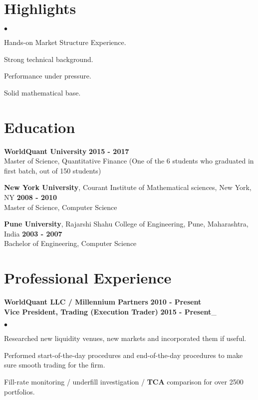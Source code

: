 \documentclass[margin,line]{res}
\newenvironment{list2}{
  \begin{list}{$\bullet$}{%
      \setlength{\itemsep}{0.05in}
      \setlength{\parsep}{0in} \setlength{\parskip}{0in}
      \setlength{\topsep}{-0.1in} \setlength{\partopsep}{0in}
      \setlength{\leftmargin}{0.2in}}}{\end{list}}
\begin{document}
\address{ 1300, Hope St, Stamford, CT 06907 $\bullet$ 917-558-4825 }
\address{ \href{mailto: harsshal@nyu.edu} {harsshal@nyu.edu} $\bullet$
          \href{https://sites.google.com/site/harsshal/}{https://sites.google.com/site/harsshal/} }

\vspace {0.1in}
\begin{resume}
\section{\sc Highlights}
\begin{list2}
\begin{minipage}{0.5\linewidth}
\item Hands-on Market Structure Experience.
\item Strong technical background.
\end{minipage}
\begin{minipage}{0.4\linewidth}
\item Performance under pressure.
\item Solid mathematical base.
\end{minipage}
\end{list2}

\section{\sc Education}
{\bf WorldQuant University} \hfill {\bf  2015 - 2017}\\
Master of Science, Quantitative Finance (One of the 6 students who graduated in first batch, out of 150 students)


{\bf New York University}, Courant Institute of Mathematical sciences, New York, NY \hfill {\bf 2008 - 2010}\\
Master of Science, Computer Science

{\bf Pune University}, Rajarshi Shahu College of Engineering, Pune, Maharashtra, India \hfill{\bf 2003 - 2007}\\
Bachelor of Engineering, Computer Science

\section{\sc Professional Experience}
{\bf WorldQuant LLC / Millennium Partners} \hfill {\bf 2010 - Present}\\
{\bf Vice President, Trading (Execution Trader)} \hfill {\bf 2015 - Present}\_
\begin{list2}
\item Researched new liquidity venues, new markets and incorporated them if useful.
\item Performed start-of-the-day procedures and end-of-the-day procedures to make sure smooth trading for the firm.
\item Fill-rate monitoring / underfill investigation / {\bf TCA} comparison for over 2500 portfolios.


\end{list2}
\end{resume}
\end{document}
